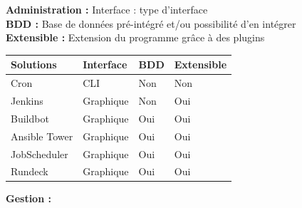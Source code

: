 \documentclass[12pt]{article}
\begin{document}
\textbf{Administration :}
Interface : type d'interface 
\vspace{0.2cm}
\\
\textbf{BDD :} Base de données pré-intégré et/ou possibilité d'en intégrer
\vspace{0.2cm}
\\
\textbf{Extensible :} Extension du programme grâce à des plugins
\vspace{0.5cm}
\\
\begin{center}
\begin{tabular}{|l|l|l|l|}
\hline
Solutions     & Interface & BDD & Extensible \\ \hline
Cron          & CLI       & Non & Non        \\ \hline
Jenkins       & Graphique & Non & Oui        \\ \hline
Buildbot      & Graphique & Oui & Oui        \\ \hline
Ansible Tower & Graphique & Oui & Oui        \\ \hline
JobScheduler  & Graphique & Oui & Oui        \\ \hline
Rundeck       & Graphique & Oui & Oui        \\ \hline
\end{tabular}
\end{center}

\vspace{0.5cm}

\textbf{Gestion :}
\end{document}
